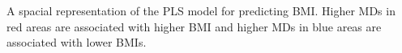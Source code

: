 \label{md_effect_map} A spacial representation of the PLS model for predicting BMI. Higher MDs in red areas are associated with higher BMI and higher MDs in blue areas are associated with lower BMIs.